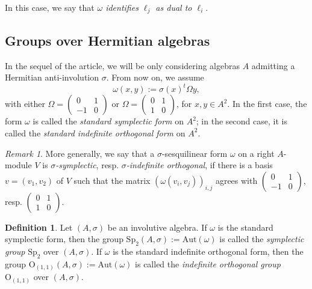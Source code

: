 \documentclass[oneside,11pt]{amsart}
\theoremstyle{definition}
\newtheorem{defn}[thm]{Definition}
\theoremstyle{remark}
\newtheorem{rem}[thm]{Remark}
\numberwithin{thm}{section}
\numberwithin{equation}{section}
\begin{document}
In this case, we say that \emph{$\omega$ identifies $\ell_j$ as dual to $\ell_i$}.



\subsection{Groups over Hermitian algebras} 

In the sequel of the article, we will be only considering algebras $A$ admitting a Hermitian anti-involution $\sigma$.
From now on, we assume 
\[\omega(x,y):=\sigma(x)^t\Omega y,\] with either $\Omega=\begin{pmatrix}0 & 1 \\ -1 & 0\end{pmatrix}$ or $\Omega=\begin{pmatrix}0 & 1 \\ 1 & 0\end{pmatrix}$, for $x,y\in A^2$. In the first case, the form $\omega$ is called the \emph{standard symplectic form} on $A^2$; in the second case, it is called the \emph{standard indefinite orthogonal form} on $A^2$.

\begin{rem}
    More generally, we say that a $\sigma$-sesquilinear form $\omega$ on a right $A$-module $V$ is \emph{$\sigma$-symplectic}, resp. \emph{$\sigma$-indefinite orthogonal}, if there is a basis $v=(v_1,v_2)$ of $V$ such that the matrix $(\omega(v_i,v_j))_{i,j}$ agrees with $\begin{pmatrix}0 & 1 \\ -1 & 0\end{pmatrix}$, resp. $\begin{pmatrix}0 & 1 \\ 1 & 0\end{pmatrix}$.
\end{rem}

\begin{defn}
Let $(A,\sigma)$ be an involutive algebra. If $\omega$ is the standard symplectic form, then the group $\mathrm{Sp}_2(A,\sigma):=\mathrm{Aut}(\omega)$ is called the \emph{symplectic group} $\mathrm{Sp}_2$ over $(A,\sigma)$.
    If $\omega$ is the standard indefinite orthogonal form, then the group $\mathrm{O}_{(1,1)}(A,\sigma):=\mathrm{Aut}(\omega)$ is called the \emph{indefinite orthogonal group} $\mathrm{O}_{(1,1)}$ over $(A,\sigma)$.
\end{defn}
\end{document}
